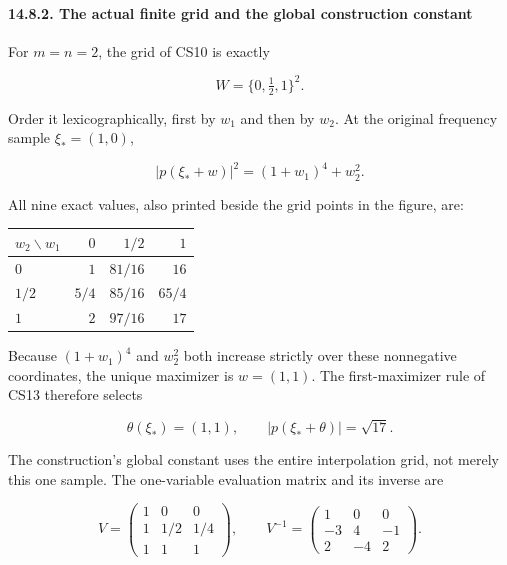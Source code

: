 \documentclass[
  11pt,
]{article}
\makeatletter
\newcounter{none} %
\let\ReaderOriginalAnchorStart\hyper@anchorstart
\let\ReaderOriginalAnchorEnd\hyper@anchorend
\let\ReaderPendingAliases\@empty
\def\ReaderArmAliases#1{\gdef\ReaderPendingAliases{#1}}
\def\hyper@anchorstart#1{\ReaderIfNativeAnchorTF{#1}{\ReaderPendingAliases\global\let\ReaderPendingAliases\@empty}{}\ReaderOriginalAnchorStart{#1}}
\makeatother
\begin{document}
\ReaderArmAliases{\ReaderOriginalAnchorStart{the-actual-finite-grid-and-the-global-construction-constant}\ReaderOriginalAnchorEnd}
\paragraph{14.8.2. The actual finite grid and the global construction
constant}\label{the-actual-finite-grid-and-the-global-construction-constant}

For \(m=n=2\), the grid of CS10 is exactly

\[
 W=\{0,\tfrac12,1\}^2.                                       \tag{CE3}
\]

Order it lexicographically, first by \(w_1\) and then by \(w_2\). At the
original frequency sample \(\xi_*=(1,0)\),

\[
 |p(\xi_*+w)|^2=(1+w_1)^4+w_2^2.                            \tag{CE4}
\]

All nine exact values, also printed beside the grid points in the
figure, are:

{\def\LTcaptype{none} %
\begin{longtable}[]{@{}lrrr@{}}
\toprule\noalign{}
\(w_2\backslash w_1\) & \(0\) & \(1/2\) & \(1\) \\
\midrule\noalign{}
\endhead
\bottomrule\noalign{}
\endlastfoot
\(0\) & \(1\) & \(81/16\) & \(16\) \\
\(1/2\) & \(5/4\) & \(85/16\) & \(65/4\) \\
\(1\) & \(2\) & \(97/16\) & \(17\) \\
\end{longtable}
}

Because \((1+w_1)^4\) and \(w_2^2\) both increase strictly over these
nonnegative coordinates, the unique maximizer is \(w=(1,1)\). The
first-maximizer rule of CS13 therefore selects

\[
 \theta(\xi_*)=(1,1),\qquad |p(\xi_*+\theta)|=\sqrt{17}.        \tag{CE5}
\]

The construction's global constant uses the entire interpolation grid,
not merely this one sample. The one-variable evaluation matrix and its
inverse are

\[
 V=\begin{pmatrix}1&0&0\\1&1/2&1/4\\1&1&1\end{pmatrix},
 \qquad
 V^{-1}=\begin{pmatrix}1&0&0\\-3&4&-1\\2&-4&2\end{pmatrix}.
                                                                    \tag{CE6}
\]
\end{document}

